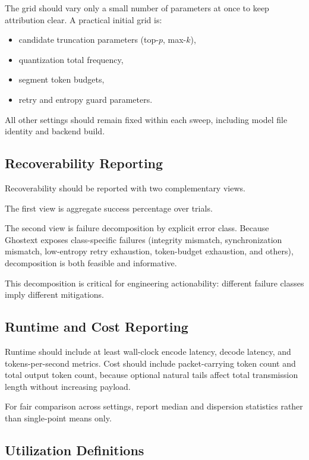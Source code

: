 The grid should vary only a small number of parameters at once to keep attribution clear. A practical initial grid is:

\begin{itemize}
\item candidate truncation parameters (top-$p$, max-$k$),
\item quantization total frequency,
\item segment token budgets,
\item retry and entropy guard parameters.
\end{itemize}

All other settings should remain fixed within each sweep, including model file identity and backend build.

\subsection{Recoverability Reporting}

Recoverability should be reported with two complementary views.

The first view is aggregate success percentage over trials.

The second view is failure decomposition by explicit error class. Because Ghostext exposes class-specific failures (integrity mismatch, synchronization mismatch, low-entropy retry exhaustion, token-budget exhaustion, and others), decomposition is both feasible and informative.

This decomposition is critical for engineering actionability: different failure classes imply different mitigations.

\subsection{Runtime and Cost Reporting}

Runtime should include at least wall-clock encode latency, decode latency, and tokens-per-second metrics. Cost should include packet-carrying token count and total output token count, because optional natural tails affect total transmission length without increasing payload.

For fair comparison across settings, report median and dispersion statistics rather than single-point means only.

\subsection{Utilization Definitions}

